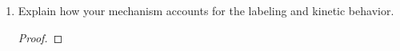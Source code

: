 \documentclass[../psets.tex]{subfiles}
\begin{document}
\begin{enumerate}
\begin{enumerate}
        \begin{proof}
            A full mechanism consistent with these observations is
            \begin{center}
                \texttt{[image: PSet4Q3a.png]}
            \end{center}
            A rate law consistent with these observations is
            \begin{equation*}
                \boxed{\rate = \frac{k_1k_2\cnc{\textbf{1}}\cnc{\textbf{2}}}{k_{-1}+k_2\cnc{\textbf{2}}}}
            \end{equation*}
        \end{proof}
        \pagebreak
        \item Explain how your mechanism accounts for the labeling and kinetic behavior.
        \begin{proof}


\end{proof}
\end{enumerate}
\end{enumerate}
\end{document}
